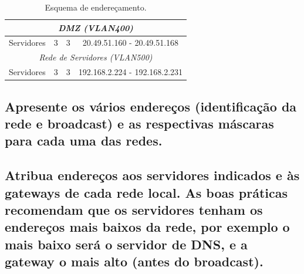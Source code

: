 \documentclass[a4paper,12pt]{article}
\begin{document}
\begin{table}[h]
\begin{tabular}{ l | c | c | c }
      \multicolumn{4}{c}{\textit{DMZ (VLAN400)}} \\\hline
      Servidores & 3 & 3 & 20.49.51.160 - 20.49.51.168 \\\hline

      \multicolumn{4}{c}{\textit{Rede de Servidores (VLAN500)}} \\\hline
      Servidores & 3 & 3 & 192.168.2.224 - 192.168.2.231 \\\hline
      \bottomrule

   \end{tabular}
   \caption{Esquema de endereçamento.}
   \label{tab:enderecamento_esquema}
\end{table}

\subsection{Apresente os vários endereços (identificação da rede e broadcast) e as respectivas máscaras para cada uma das redes.}
\subsection{Atribua endereços aos servidores indicados e às gateways de cada rede local.
As boas práticas recomendam que os servidores tenham os endereços mais
baixos da rede, por exemplo o mais baixo será o servidor de DNS, e a gateway
o mais alto (antes do broadcast).}
\end{document}
